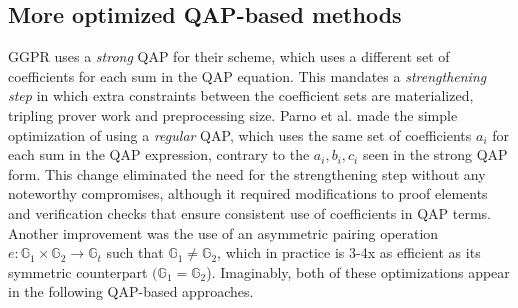 \subsection{More optimized QAP-based methods}
\noindent GGPR uses a \textit{strong} QAP for their scheme, which uses a different set of coefficients for each sum in the QAP equation. This mandates a \textit{strengthening step} in which extra constraints between the coefficient sets are materialized, tripling prover work and preprocessing size. Parno et al. \cite{pinocchio} made the simple optimization of using a \textit{regular} QAP, which uses the same set of coefficients $a_i$ for each sum in the QAP expression, contrary to the $a_i, b_i, c_i$ seen in the strong QAP form. This change eliminated the need for the strengthening step without any noteworthy compromises, although it required modifications to proof elements and verification checks that ensure consistent use of coefficients in QAP terms. Another improvement was the use of an asymmetric pairing operation $e: \mathbb{G}_1 \times \mathbb{G}_2 \to \mathbb{G}_t$ such that $\mathbb{G}_1 \ne \mathbb{G}_2$, which in practice is 3-4x as efficient as its symmetric counterpart $(\mathbb{G}_1 = \mathbb{G}_2$). Imaginably, both of these optimizations appear in the following QAP-based approaches.\\

